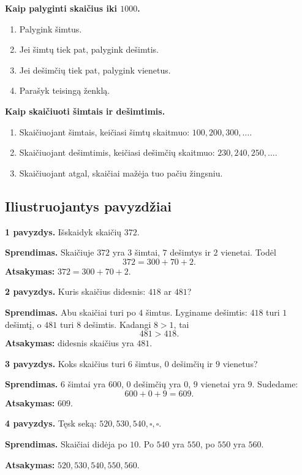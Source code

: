 \textbf{Kaip palyginti skaičius iki \(1000\).}
\begin{enumerate}
\item Palygink šimtus.
\item Jei šimtų tiek pat, palygink dešimtis.
\item Jei dešimčių tiek pat, palygink vienetus.
\item Parašyk teisingą ženklą.
\end{enumerate}

\textbf{Kaip skaičiuoti šimtais ir dešimtimis.}
\begin{enumerate}
\item Skaičiuojant šimtais, keičiasi šimtų skaitmuo: \(100,200,300,\ldots\).
\item Skaičiuojant dešimtimis, keičiasi dešimčių skaitmuo: \(230,240,250,\ldots\).
\item Skaičiuojant atgal, skaičiai mažėja tuo pačiu žingsniu.
\end{enumerate}

\subsection{Iliustruojantys pavyzdžiai}

\textbf{1 pavyzdys.} Išskaidyk skaičių \(372\).

\textbf{Sprendimas.} Skaičiuje \(372\) yra \(3\) šimtai, \(7\) dešimtys ir \(2\) vienetai. Todėl
\[
372=300+70+2.
\]
\textbf{Atsakymas:} \(372=300+70+2\).

\textbf{2 pavyzdys.} Kuris skaičius didesnis: \(418\) ar \(481\)?

\textbf{Sprendimas.} Abu skaičiai turi po \(4\) šimtus. Lyginame dešimtis: \(418\) turi \(1\) dešimtį, o \(481\) turi \(8\) dešimtis. Kadangi \(8>1\), tai
\[
481>418.
\]
\textbf{Atsakymas:} didesnis skaičius yra \(481\).

\textbf{3 pavyzdys.} Koks skaičius turi \(6\) šimtus, \(0\) dešimčių ir \(9\) vienetus?

\textbf{Sprendimas.} \(6\) šimtai yra \(600\), \(0\) dešimčių yra \(0\), \(9\) vienetai yra \(9\). Sudedame:
\[
600+0+9=609.
\]
\textbf{Atsakymas:} \(609\).

\textbf{4 pavyzdys.} Tęsk seką: \(520,530,540,\square,\square\).

\textbf{Sprendimas.} Skaičiai didėja po \(10\). Po \(540\) yra \(550\), po \(550\) yra \(560\).

\textbf{Atsakymas:} \(520,530,540,550,560\).

